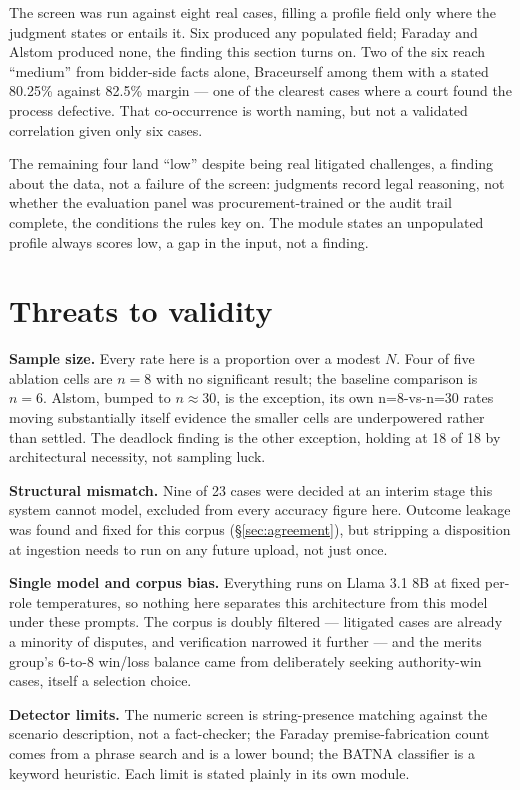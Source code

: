 The screen was run against eight real cases, filling a profile field only
where the judgment states or entails it. Six produced any populated field;
Faraday and Alstom produced none, the finding this section turns on. Two of
the six reach ``medium'' from bidder-side facts alone, Braceurself among
them with a stated 80.25\% against 82.5\% margin --- one of the clearest
cases where a court found the process defective. That co-occurrence is
worth naming, but not a validated correlation given only six cases.

The remaining four land ``low'' despite being real litigated challenges, a
finding about the data, not a failure of the screen: judgments record
legal reasoning, not whether the evaluation panel was procurement-trained
or the audit trail complete, the conditions the rules key on. The module
states an unpopulated profile always scores low, a gap in the input, not a
finding.

\section{Threats to validity}
\label{sec:threats}

\textbf{Sample size.} Every rate here is a proportion over a modest $N$.
Four of five ablation cells are $n=8$ with no significant result; the
baseline comparison is $n=6$. Alstom, bumped to $n{\approx}30$, is the
exception, its own n=8-vs-n=30 rates moving substantially itself evidence
the smaller cells are underpowered rather than settled. The deadlock
finding is the other exception, holding at 18 of 18 by architectural
necessity, not sampling luck.

\textbf{Structural mismatch.} Nine of 23 cases were decided at an interim
stage this system cannot model, excluded from every accuracy figure here.
Outcome leakage was found and fixed for this corpus (\S\ref{sec:agreement}),
but stripping a disposition at ingestion needs to run on any future
upload, not just once.

\textbf{Single model and corpus bias.} Everything runs on Llama 3.1 8B at
fixed per-role temperatures, so nothing here separates this architecture
from this model under these prompts. The corpus is doubly filtered ---
litigated cases are already a minority of disputes, and verification
narrowed it further --- and the merits group's 6-to-8 win/loss balance came
from deliberately seeking authority-win cases, itself a selection choice.

\textbf{Detector limits.} The numeric screen is string-presence matching
against the scenario description, not a fact-checker; the Faraday
premise-fabrication count comes from a phrase search and is a lower bound;
the BATNA classifier is a keyword heuristic. Each limit is stated plainly in
its own module.